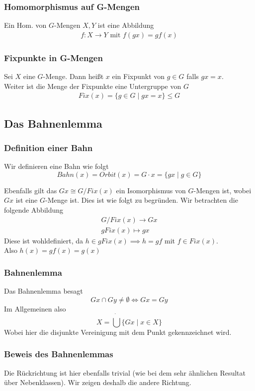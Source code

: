 \documentclass[12pt, german]{article}
\begin{document}
\subsubsection{Homomorphismus auf G-Mengen}
	Ein Hom. von $G$-Mengen $X,Y$ ist eine Abbildung 
	\begin{align*}
		f: X \to Y \text{ mit } f(gx) = gf(x)
	\end{align*}

\subsubsection{Fixpunkte in G-Mengen}
	Sei $X$ eine  $G$-Menge. Dann heißt $x$ ein Fixpunkt von $g \in G$ falls $gx=x$. \\
	Weiter ist die Menge der Fixpunkte eine Untergruppe von $G$
	\begin{align*}
		Fix(x) = \{g \in G \mid  gx = x\} \leq G 
	\end{align*}


\subsection{Das Bahnenlemma}		
\subsubsection{Definition einer Bahn}
	Wir definieren eine Bahn wie folgt $$Bahn(x) = Orbit(x) = G\cdot x = \{gx \mid  g \in G \}$$
	
	
	Ebenfalls gilt das $Gx \cong G/Fix(x)$ ein Isomorphismus von $G$-Mengen ist, wobei $Gx$ ist eine $G$-Menge ist. 
	Dies ist wie folgt zu begründen. Wir betrachten die folgende Abbildung
	\begin{align*}
		G/Fix(x) \to Gx \\ 
		gFix(x) \mapsto gx
	 \end{align*}
	 Diese ist wohldefiniert, da $h \in gFix(x) \implies h=gf$ mit $f \in Fix(x)$. \\ 
	 Also $h(x) = gf(x) = g(x)$ 


\subsubsection{Bahnenlemma}
	Das Bahnenlemma besagt $$Gx \cap Gy \not = \emptyset \iff Gx = Gy$$
	Im Allgemeinen also $$ X = \dot{\bigcup} \{Gx \mid  x \in X \}$$ Wobei hier die disjunkte Vereinigung mit dem Punkt gekennzeichnet wird. 
\subsubsection{Beweis des Bahnenlemmas}
	Die Rückrichtung ist hier ebenfalls trivial (wie bei dem sehr ähnlichen Resultat über Nebenklassen). Wir zeigen deshalb die andere Richtung. \\ 
	
\end{document}
